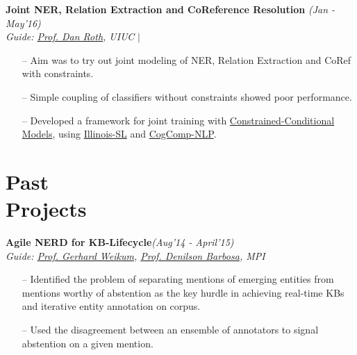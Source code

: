 \documentclass[margin,line]{templates/resume}
\newcommand{\myhref}[3][blue]{\href{#2}{\color{#1}{#3}}}
\newcommand{\compresslist}{%
\setlength{\itemsep}{3pt}%
\setlength{\parskip}{0pt}%
\setlength{\parsep}{0pt}%
}
\begin{document}
\begin{resume}
\newpage
\vspace{-0.1cm}    
\textsf{\textbf{Joint NER, Relation Extraction and CoReference Resolution}} \hfill\textit{\small(Jan - May'16)}
\\ {\textit{Guide: \href{http://www.cis.upenn.edu/~danroth/}{Prof. Dan Roth}, UIUC}} \hfill{\myhref[darkblue]{https://shatu.github.io/\#cs546}{Web} $|$ \myhref[darkblue]{https://github.com/shatu/Joint-NER-RelEx-Coref}{Github}}
\normalsize
\vspace{0.05cm}
\begin{itemize}[leftmargin=*]\compresslist
\item[--]Aim was to try out joint modeling of NER, Relation Extraction and CoRef with constraints.
\item[--]Simple coupling of classifiers without constraints showed poor performance.
\item[--]Developed a framework for joint training with \href{https://en.wikipedia.org/wiki/Constrained_conditional_model}{Constrained-Conditional Models}, using \href{https://github.com/CogComp/illinois-sl}{Illinois-SL} and \href{https://github.com/CogComp/cogcomp-nlp}{CogComp-NLP}. 
\end{itemize}


\section{\mysidestyle Past\\Projects}
\textsf{\textbf{Agile NERD for KB-Lifecycle}}\hfill\textit{\small(Aug'14 - April'15)}
\\ {\textit{Guide: \href{https://people.mpi-inf.mpg.de/~weikum/}{Prof. Gerhard Weikum}, \href{https://sites.ualberta.ca/~denilson/}{Prof. Denilson Barbosa}, MPI}} \hfill{\myhref[darkblue]{https://shatu.github.io/\#mpi}{Web}}
\vspace{0.05cm}
\begin{itemize}[leftmargin=*]\compresslist
\item[--]Identified the problem of separating mentions of emerging entities from mentions worthy of abstention as the key hurdle in achieving real-time KBs and iterative entity annotation on corpus. 
\item[--]Used the disagreement between an ensemble of annotators to signal abstention on a given mention.
\end{itemize}


\end{resume}
\end{document}
